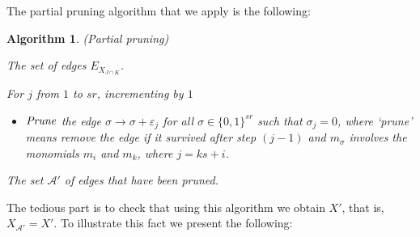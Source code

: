 \documentclass[12pt]{amsart}
\newtheorem{algorithm}[theorem]{Algorithm}
\theoremstyle{definition}
\theoremstyle{remark}
\numberwithin{equation}{section}
\newcommand{\lcm}{\mathrm {lcm\, }}
\newcommand{\cA}{{\mathcal A}}
\newcommand{\lra}{{\longrightarrow}}
\newcommand{\phil}[1]{{\color{red} \sf $\star\star$ Philippe: [#1]}}
\begin{document}

 \vskip 2mm

 The partial pruning algorithm that we apply is the following:

 \vskip 2mm


 \begin{algorithm}\label{alg4} { (Partial pruning)}

\vskip 2mm

{\rm {} The set of edges $E_{X_{J\cap K}}$.


\vskip 2mm



For $j$ from $1$ to $sr$, incrementing by $1$

\vskip 2mm

 \begin{itemize}



\item[\textbf{(j)}] ${\it Prune}$ the edge ${\sigma} \lra{\sigma + \varepsilon_j}$ for
all $\sigma \in \{0,1\}^{sr}$ such that $\sigma_j=0$, where `prune'
means remove the edge if  it survived after step $(j-1)$ and
$m_\sigma$ involves the monomials $m_i$ and $m_k$, where $j=ks+i$.

\end{itemize}

\vskip 2mm


 The set $\cA'$ of edges that have been pruned.

}

\end{algorithm}


The tedious part is to check that using this algorithm we obtain $X'$, that is, $X_{\cA'}=X'$.
To illustrate this fact we present the following:



\end{document}
